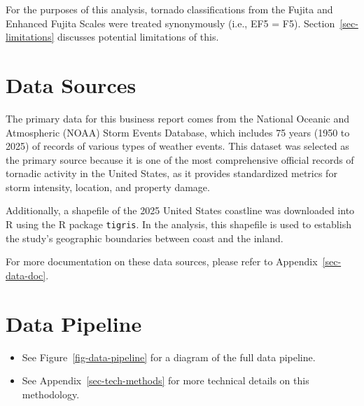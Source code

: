 \documentclass[
  letterpaper,
  DIV=11,
  numbers=noendperiod]{scrreprt}
\providecommand{\tightlist}{%
  \setlength{\itemsep}{0pt}\setlength{\parskip}{0pt}}
\begin{document}
\begin{tcolorbox}[enhanced jigsaw, bottomrule=.15mm, colframe=quarto-callout-important-color-frame, colback=white, opacityback=0, toptitle=1mm, leftrule=.75mm, arc=.35mm, title=\textcolor{quarto-callout-important-color}{\faExclamation}\hspace{0.5em}{Important}, bottomtitle=1mm, colbacktitle=quarto-callout-important-color!10!white, coltitle=black, breakable, titlerule=0mm, opacitybacktitle=0.6, rightrule=.15mm, toprule=.15mm, left=2mm]

For the purposes of this analysis, tornado classifications from the
Fujita and Enhanced Fujita Scales were treated synonymously (i.e., EF5 =
F5). Section~\ref{sec-limitations} discusses potential limitations of
this.

\end{tcolorbox}

\section{Data Sources}\label{data-sources}

The primary data for this business report comes from the National
Oceanic and Atmospheric (NOAA) Storm Events Database, which includes 75
years (1950 to 2025) of records of various types of weather events. This
dataset was selected as the primary source because it is one of the most
comprehensive official records of tornadic activity in the United
States, as it provides standardized metrics for storm intensity,
location, and property damage.

Additionally, a shapefile of the 2025 United States coastline was
downloaded into R using the R package \texttt{tigris}. In the analysis,
this shapefile is used to establish the study's geographic boundaries
between coast and the inland.

For more documentation on these data sources, please refer to
Appendix~\ref{sec-data-doc}.

\section{Data Pipeline}\label{data-pipeline}

\begin{tcolorbox}[enhanced jigsaw, bottomrule=.15mm, colframe=quarto-callout-note-color-frame, colback=white, opacityback=0, toptitle=1mm, leftrule=.75mm, arc=.35mm, title=\textcolor{quarto-callout-note-color}{\faInfo}\hspace{0.5em}{Note}, bottomtitle=1mm, colbacktitle=quarto-callout-note-color!10!white, coltitle=black, breakable, titlerule=0mm, opacitybacktitle=0.6, rightrule=.15mm, toprule=.15mm, left=2mm]

\begin{itemize}
\tightlist
\item
  See Figure~\ref{fig-data-pipeline} for a diagram of the full data
  pipeline.
\item
  See Appendix~\ref{sec-tech-methods} for more technical details on this
  methodology.
\end{itemize}

\end{tcolorbox}
\end{document}
